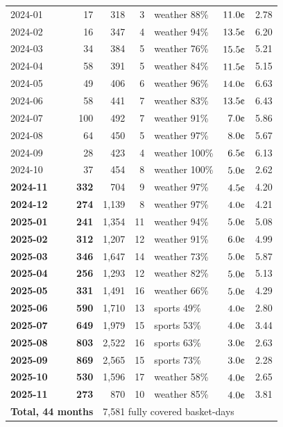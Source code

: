 \documentclass[11pt,a4paper]{article}
\newcommand{\cent}{\text{\textcent}}
\begin{document}
{\begin{longtable}{lrrrlrr}
2024-01 & 17 & 318 & 3 & weather 88\% & $11.0\cent$ & 2.78 \\
2024-02 & 16 & 347 & 4 & weather 94\% & $13.5\cent$ & 6.20 \\
2024-03 & 34 & 384 & 5 & weather 76\% & $15.5\cent$ & 5.21 \\
2024-04 & 58 & 391 & 5 & weather 84\% & $11.5\cent$ & 5.15 \\
2024-05 & 49 & 406 & 6 & weather 96\% & $14.0\cent$ & 6.63 \\
2024-06 & 58 & 441 & 7 & weather 83\% & $13.5\cent$ & 6.43 \\
2024-07 & 100 & 492 & 7 & weather 91\% & $7.0\cent$ & 5.86 \\
2024-08 & 64 & 450 & 5 & weather 97\% & $8.0\cent$ & 5.67 \\
2024-09 & 28 & 423 & 4 & weather 100\% & $6.5\cent$ & 6.13 \\
2024-10 & 37 & 454 & 8 & weather 100\% & $5.0\cent$ & 2.62 \\
\midrule
\textbf{2024-11} & \textbf{332} & 704 & 9 & weather 97\% & $4.5\cent$ & 4.20 \\
\textbf{2024-12} & \textbf{274} & 1{,}139 & 8 & weather 97\% & $4.0\cent$ & 4.21 \\
\textbf{2025-01} & \textbf{241} & 1{,}354 & 11 & weather 94\% & $5.0\cent$ & 5.08 \\
\textbf{2025-02} & \textbf{312} & 1{,}207 & 12 & weather 91\% & $6.0\cent$ & 4.99 \\
\textbf{2025-03} & \textbf{346} & 1{,}647 & 14 & weather 73\% & $5.0\cent$ & 5.87 \\
\textbf{2025-04} & \textbf{256} & 1{,}293 & 12 & weather 82\% & $5.0\cent$ & 5.13 \\
\textbf{2025-05} & \textbf{331} & 1{,}491 & 16 & weather 66\% & $5.0\cent$ & 4.29 \\
\textbf{2025-06} & \textbf{590} & 1{,}710 & 13 & sports 49\% & $4.0\cent$ & 2.80 \\
\textbf{2025-07} & \textbf{649} & 1{,}979 & 15 & sports 53\% & $4.0\cent$ & 3.44 \\
\textbf{2025-08} & \textbf{803} & 2{,}522 & 16 & sports 63\% & $3.0\cent$ & 2.63 \\
\textbf{2025-09} & \textbf{869} & 2{,}565 & 15 & sports 73\% & $3.0\cent$ & 2.28 \\
\textbf{2025-10} & \textbf{530} & 1{,}596 & 17 & weather 58\% & $4.0\cent$ & 2.65 \\
\textbf{2025-11} & \textbf{273} & 870 & 10 & weather 85\% & $4.0\cent$ & 3.81 \\
\midrule
\multicolumn{2}{l}{\textbf{Total, 44 months}} & \multicolumn{5}{l}{7,581 fully covered basket-days} \\
\end{longtable}}
\end{document}
